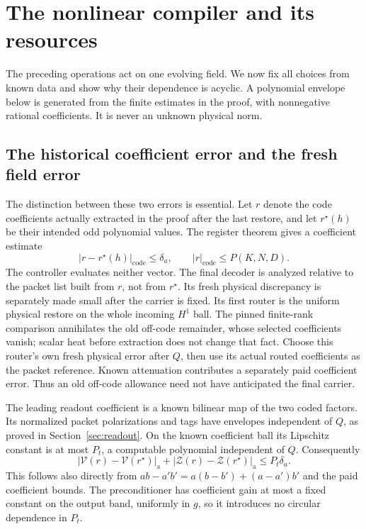\documentclass[11pt,a4paper]{amsart}
\theoremstyle{definition}
\theoremstyle{remark}
\numberwithin{equation}{section}
\begin{document}
\section{The nonlinear compiler and its resources}\label{sec:nonlinear-compiler}
The preceding operations act on one evolving field. We now fix all choices
from known data and show why their dependence is acyclic. A polynomial
envelope below is generated from the finite estimates in the proof, with
nonnegative rational coefficients. It is never an unknown physical norm.

\subsection{The historical coefficient error and the fresh field error}
The distinction between these two errors is essential. Let $r$ denote the
code coefficients actually extracted in the proof after the last restore,
and let $r^\star(h)$ be their intended odd polynomial values. The register
theorem gives a coefficient estimate
\begin{equation}\label{eq:historical-coefficient-error}
 |r-r^\star(h)|_{\mathrm{code}}\le\delta_a,
 \qquad |r|_{\mathrm{code}}\le P(K,N,D).
\end{equation}
The controller evaluates neither vector. The final decoder is analyzed
relative to the packet list built from $r$, not from $r^\star$. Its fresh
physical discrepancy is separately made small after the carrier is fixed.
Its first router is the uniform physical restore on the whole incoming
$H^1$ ball. The pinned finite-rank comparison annihilates the old off-code
remainder, whose selected coefficients vanish; scalar heat before extraction
does not change that fact. Choose this router's own fresh physical error
after $Q$, then use its actual routed coefficients as the packet reference.
Known attenuation contributes a separately paid coefficient error.
Thus an old off-code allowance need not have anticipated the final carrier.

The leading readout coefficient is a known bilinear map of the two coded
factors. Its normalized packet polarizations and tags have envelopes
independent of $Q$, as proved in Section~\ref{sec:readout}. On the known
coefficient ball its Lipschitz constant is at most $P_t$, a computable
polynomial independent of $Q$. Consequently
\begin{equation}\label{eq:coefficient-lipschitz}
 |\mathcal V(r)-\mathcal V(r^\star)|_{\mathrm a}
       +|\mathcal Z(r)-\mathcal Z(r^\star)|_{\mathrm a}
 \le P_t\delta_a.
\end{equation}
This follows also directly from $ab-a'b'=a(b-b')+(a-a')b'$ and the paid
coefficient bounds. The preconditioner has coefficient gain at most a fixed
constant on the output band, uniformly in $g$, so it introduces no circular
dependence in $P_t$.
\end{document}
